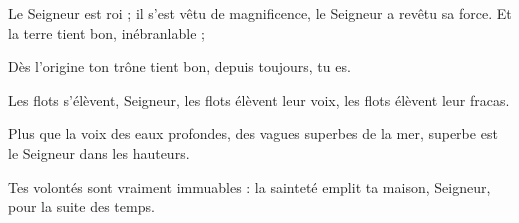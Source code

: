 \item Le Seigneur est roi ; il s'est vêtu de magnificence, le Seigneur a revêtu sa force. Et la terre tient bon, inébranlable ;

\item Dès l'origine ton trône tient bon, depuis toujours, tu es.

\item Les flots s'élèvent, Seigneur, les flots élèvent leur voix, les flots élèvent leur fracas.

\item Plus que la voix des eaux profondes, des vagues superbes de la mer, superbe est le Seigneur dans les hauteurs.

\item Tes volontés sont vraiment immuables : la sainteté emplit ta maison, Seigneur, pour la suite des temps.